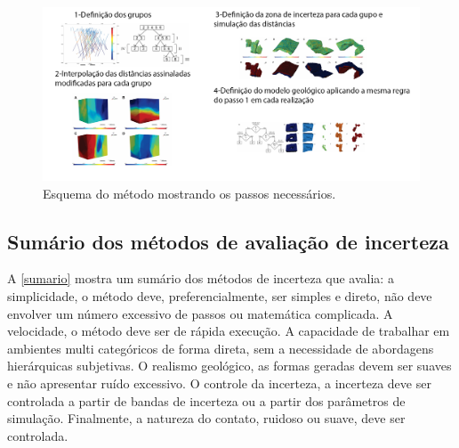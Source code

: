 \begin{figure}[H]
	\caption{\label{hier_ex}Esquema do método mostrando os passos necessários.}
	\begin{center}
		\includegraphics[width=\textwidth]{capitulo_2/hier_example.png}
	\end{center}
\end{figure}

\subsection{Sumário dos métodos de avaliação de incerteza}

A \autoref{sumario} mostra um sumário dos métodos de incerteza que avalia: a simplicidade, o método deve, preferencialmente, ser simples e direto, não deve envolver um número excessivo de passos ou matemática complicada. A velocidade, o método deve ser de rápida execução. A capacidade de trabalhar em ambientes multi categóricos de forma direta, sem a necessidade de abordagens hierárquicas subjetivas. O realismo geológico, as formas geradas devem ser suaves e não apresentar ruído excessivo. O controle da incerteza, a incerteza deve ser controlada a partir de bandas de incerteza ou a partir dos parâmetros de simulação. Finalmente, a natureza do contato, ruidoso ou suave, deve ser controlada.


